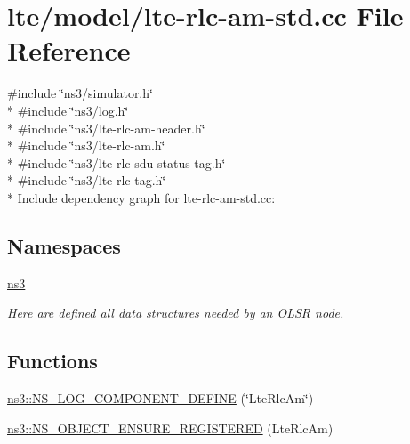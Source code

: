 \hypertarget{lte-rlc-am-std_8cc}{}\section{lte/model/lte-\/rlc-\/am-\/std.cc File Reference}
\label{lte-rlc-am-std_8cc}
{\ttfamily \#include \char`\"{}ns3/simulator.\+h\char`\"{}}\\*
{\ttfamily \#include \char`\"{}ns3/log.\+h\char`\"{}}\\*
{\ttfamily \#include \char`\"{}ns3/lte-\/rlc-\/am-\/header.\+h\char`\"{}}\\*
{\ttfamily \#include \char`\"{}ns3/lte-\/rlc-\/am.\+h\char`\"{}}\\*
{\ttfamily \#include \char`\"{}ns3/lte-\/rlc-\/sdu-\/status-\/tag.\+h\char`\"{}}\\*
{\ttfamily \#include \char`\"{}ns3/lte-\/rlc-\/tag.\+h\char`\"{}}\\*
Include dependency graph for lte-\/rlc-\/am-\/std.cc\+:
\subsection*{Namespaces}
\begin{DoxyCompactItemize}
\item 
 \hyperlink{namespacens3}{ns3}
\begin{DoxyCompactList}\small\item\em Here are defined all data structures needed by an O\+L\+SR node. \end{DoxyCompactList}\end{DoxyCompactItemize}
\subsection*{Functions}
\begin{DoxyCompactItemize}
\item 
\hyperlink{namespacens3_a919546a1e4a111b834703975e30c7101}{ns3\+::\+N\+S\+\_\+\+L\+O\+G\+\_\+\+C\+O\+M\+P\+O\+N\+E\+N\+T\+\_\+\+D\+E\+F\+I\+NE} (\char`\"{}Lte\+Rlc\+Am\char`\"{})
\item 
\hyperlink{namespacens3_a820cbe3050aa12ba4c75fd9581bf7d48}{ns3\+::\+N\+S\+\_\+\+O\+B\+J\+E\+C\+T\+\_\+\+E\+N\+S\+U\+R\+E\+\_\+\+R\+E\+G\+I\+S\+T\+E\+R\+ED} (Lte\+Rlc\+Am)
\end{DoxyCompactItemize}

